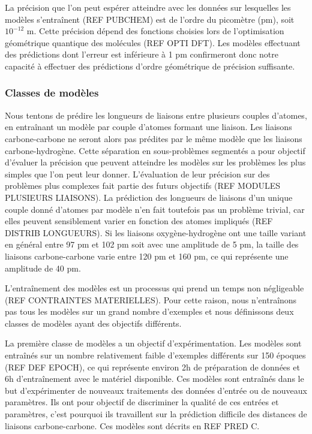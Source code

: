 \par La précision que l'on peut espérer atteindre avec les données sur lesquelles les modèles s'entraînent (REF PUBCHEM) est de l'ordre du picomètre (pm), soit $10^{-12}$ m. Cette précision dépend des fonctions choisies lors de l'optimisation géométrique quantique des molécules (REF OPTI DFT). Les modèles effectuant des prédictions dont l'erreur est inférieure à 1 pm confirmeront donc notre capacité à effectuer des prédictions d'ordre géométrique de précision suffisante.

\subsubsection{Classes de modèles}
\par Nous tentons de prédire les longueurs de liaisons entre plusieurs couples d'atomes, en entraînant un modèle par couple d'atomes formant une liaison. Les liaisons carbone-carbone ne seront alors pas prédites par le même modèle que les liaisons carbone-hydrogène. Cette séparation en sous-problèmes segmentés a pour objectif d'évaluer la précision que peuvent atteindre les modèles sur les problèmes les plus simples que l'on peut leur donner. L'évaluation de leur précision sur des problèmes plus complexes fait partie des futurs objectifs (REF	MODULES PLUSIEURS LIAISONS). La prédiction des longueurs de liaisons d'un unique couple donné d'atomes par modèle n'en fait toutefois pas un problème trivial, car elles peuvent sensiblement varier en fonction des atomes impliqués (REF DISTRIB LONGUEURS). Si les liaisons oxygène-hydrogène ont une taille variant en général entre 97 pm et 102 pm soit avec une amplitude de 5 pm, la taille des liaisons carbone-carbone varie entre 120 pm et 160 pm, ce qui représente une amplitude de 40 pm. \\
\par L'entraînement des modèles est un processus qui prend un temps non négligeable (REF CONTRAINTES MATERIELLES). Pour cette raison, nous n'entraînons pas tous les modèles sur un grand nombre d'exemples et nous définissons deux classes de modèles ayant des objectifs différents. \\
\par La première classe de modèles a un objectif d'expérimentation. Les modèles sont entraînés sur un nombre relativement faible d'exemples différents sur 150 époques (REF DEF EPOCH), ce qui représente environ 2h de préparation de données et 6h d'entraînement avec le matériel disponible. Ces modèles sont entraînés dans le but d'expérimenter de nouveaux traitements des données d'entrée ou de nouveaux paramètres. Ils ont pour objectif de discriminer la qualité de ces entrées et paramètres, c'est pourquoi ils travaillent sur la prédiction difficile des distances de liaisons carbone-carbone. Ces modèles sont décrits en REF PRED C.	\\
